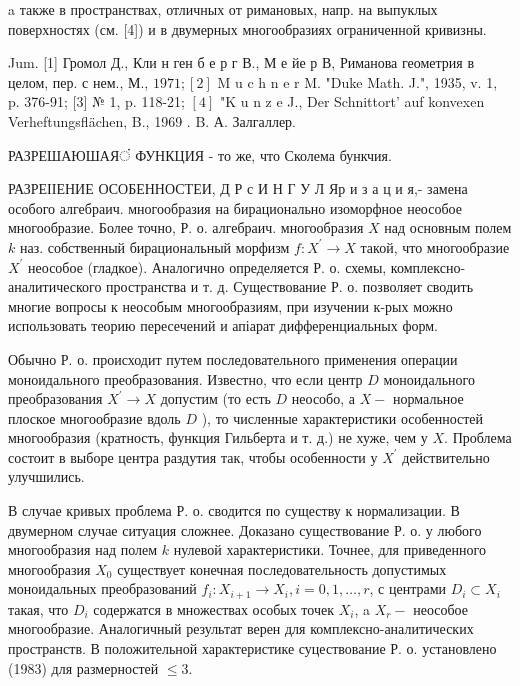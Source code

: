 \documentclass[10pt]{article}
\begin{document}
a также в пространствах, отличных от римановых, напр. на выпуклых поверхностях (см. [4]) и в двумерных многообразиях ограниченной кривизны.



Jum. [1] Громол Д., Кли н ген б е р г В., М е йе р В, Риманова геометрия в целом, пер. с нем., М., $1971 ;[2]$ M u c h n e r M. "Duke Math. J.", 1935, v. 1, p. 376-91; [3] № 1, p. 118-21; $[4]$ "K u n z e J., Der Schnittort' auf konvexen Verheftungsflächen, B., 1969 . B. А. Залгаллер.



РАЗРЕШАЮШАЯं ФУНКЦИЯ - то же, что Сколема бункчия.



РАЗРЕІІЕНИЕ ОСОБЕННОСТЕИ, Д Р с И Н Г У Л Яр и з а ц и я,- замена особого алгебраич. многообразия на бирационально изоморфное неособое многообразие. Более точно, Р. о. алгебраич. многообразия $X$ над основным полем $k$ наз. собственный бирациональный морфизм $f: X^{\prime} \rightarrow X$ такой, что многообразие $X^{\prime}$ неособое (гладкое). Аналогично определяется Р. о. схемы, комплексно-аналитического пространства и т. д. Существование Р. о. позволяет сводить многие вопросы к неособым многообразиям, при изучении к-рых можно использовать теорию пересечений и апіарат дифференциальных форм.



Обычно Р. о. происходит путем последовательного применения операции моноидального преобразования. Известно, что если центр $D$ моноидального преобразования $X^{\prime} \rightarrow X$ допустим (то есть $D$ неособо, а $X-$ нормальное плоское многообразие вдоль $D$ ), то численные характеристики особенностей многообразия (кратность, функция Гильберта и т. д.) не хуже, чем у $X$. Проблема состоит в выборе центра раздутия так, чтобы особенности у $X^{\prime}$ действительно улучшились.



В случае кривых проблема Р. о. сводится по существу к нормализации. В двумерном случае ситуация сложнее. Доказано существование Р. о. у любого многообразия над полем $k$ нулевой характеристики. Точнее, для приведенного многообразия $X_{0}$ существует конечная последовательность допустимых моноидальных преобразований $f_{i}: X_{i+1} \rightarrow X_{i}, i=0,1, \ldots, r$, с центрами $D_{i} \subset X_{i}$ такая, что $D_{i}$ содержатся в множествах особых точек $X_{i}$, a $X_{r}-$ неособое многообразие. Аналогичный результат верен для комплексно-аналитических пространств. В положительной характеристике суцествование Р. о. установлено (1983) для размерностей $\leqslant 3$.
\end{document}

